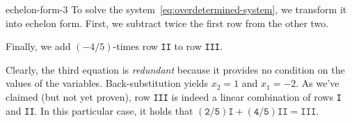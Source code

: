 \begin{example}{}{echelon-form-3}
 To solve the system~\eqref{eq:overdetermined-system}, we transform it into
 echelon form. First, we subtract twice the first row from the other two.
 \begin{center}
 \end{center}
 Finally, we add $(-4 / 5)$-times row \texttt{II} to row \texttt{III}.
 \begin{center}
 \end{center}
 Clearly, the third equation is \emph{redundant} because it provides no
 condition on the values of the variables. Back-substitution yields $x_2 = 1$
 and $x_1 = -2$. As we've claimed (but not yet proven), row \texttt{III} is
 indeed a linear combination of rows \texttt{I} and \texttt{II}. In this
 particular case, it holds that $\mathtt{(2 / 5)I + (4 / 5)II = III}$.
\end{example}
